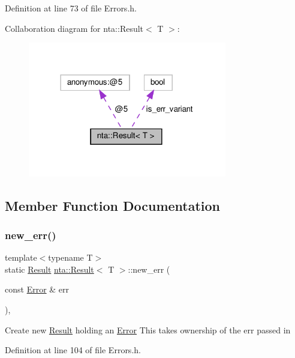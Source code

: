 Definition at line 73 of file Errors.\+h.



Collaboration diagram for nta\+:\+:Result$<$ T $>$\+:\nopagebreak
\begin{figure}[H]
\begin{center}
\leavevmode
\includegraphics[width=246pt]{d6/da5/classnta_1_1Result__coll__graph}
\end{center}
\end{figure}


\subsection{Member Function Documentation}
\mbox{\label{classnta_1_1Result_ad65a9140ae2a03cfb13bd30f848b1aa5}} 
\subsubsection{\texorpdfstring{new\+\_\+err()}{new\_err()}}
{\footnotesize\ttfamily template$<$typename T$>$ \\
static \hyperlink{classnta_1_1Result}{Result} \hyperlink{classnta_1_1Result}{nta\+::\+Result}$<$ T $>$\+::new\+\_\+err (\begin{DoxyParamCaption}\item[{const \hyperlink{structnta_1_1Error}{Error} \&}]{err }\end{DoxyParamCaption})\hspace{0.3cm}{\ttfamily [inline]}, {\ttfamily [static]}}

Create new \hyperlink{classnta_1_1Result}{Result} holding an \hyperlink{structnta_1_1Error}{Error} This takes ownership of the err passed in 

Definition at line 104 of file Errors.\+h.



